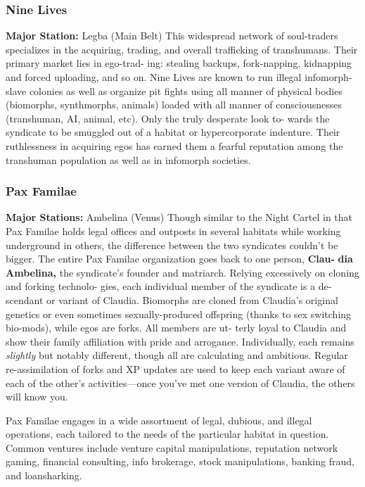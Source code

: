 \subsubsection{Nine Lives}

\textbf{Major Station:} Legba (Main Belt)
This widespread network of soul-traders specializes 
in the acquiring, trading, and overall trafficking of 
transhumans. Their primary market lies in ego-trad-
ing: stealing backups, fork-napping, kidnapping and 
forced uploading, and so on. Nine Lives are known 
to run illegal infomorph-slave colonies as well as 
organize pit fights using all manner of physical 
bodies (biomorphs, synthmorphs, animals) loaded 
with all manner of consciousnesses (transhuman, 
AI, animal, etc). Only the truly desperate look to-
wards the syndicate to be smuggled out of a habitat 
or hypercorporate indenture. Their ruthlessness in 
acquiring egos has earned them a fearful reputation 
among the transhuman population as well as in 
infomorph societies.

\subsubsection{Pax Familae}

\textbf{Major Stations: }Ambelina (Venus)
Though similar to the Night Cartel in that Pax Familae 
holds legal offices and outposts in several habitats while 
working underground in others, the difference between 
the two syndicates couldn't be bigger. The entire Pax 
Familae organization goes back to one person, \textbf{Clau-}
\textbf{dia Ambelina,} the syndicate's founder and matriarch. 
Relying excessively on cloning and forking technolo-
gies, each individual member of the syndicate is a de-
scendant or variant of Claudia. Biomorphs are cloned 
from Claudia's original genetics or even sometimes 
sexually-produced offspring (thanks to sex switching 
bio-mods), while egos are forks. All members are ut-
terly loyal to Claudia and show their family affiliation 
with pride and arrogance. Individually, each remains 
\textit{slightly} but notably different, though all are calculating 
and ambitious. Regular re-assimilation of forks and XP 
updates are used to keep each variant aware of each of 
the other's activities—once you've met one version of 
Claudia, the others will know you.

Pax Familae engages in a wide assortment of legal, 
dubious, and illegal operations, each tailored to the 
needs of the particular habitat in question. Common 
ventures include venture capital manipulations, 
reputation network gaming, financial  consulting, 
info brokerage, stock manipulations, banking fraud, 
and loansharking.

